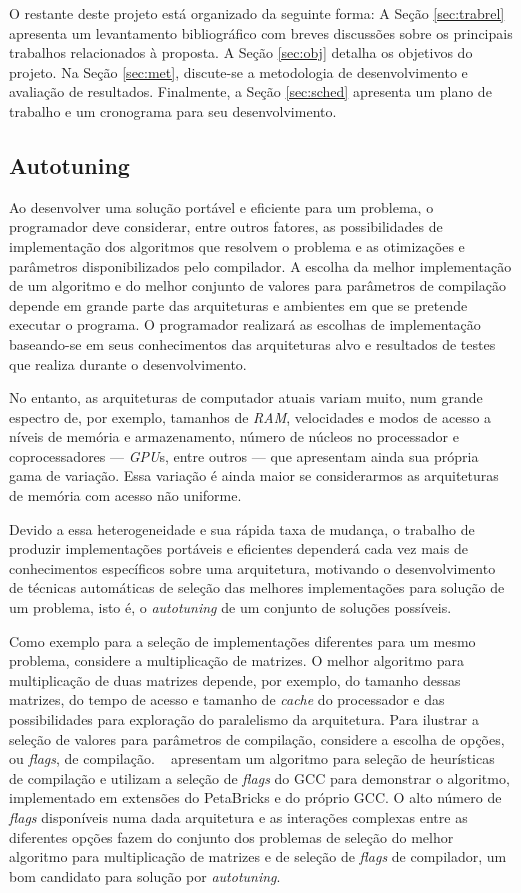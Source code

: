\documentclass[a4paper, 12pt]{article}
\begin{document}
O restante deste projeto está organizado da seguinte forma: 
A Seção \ref{sec:trabrel} apresenta um levantamento bibliográfico com breves
discussões sobre os principais trabalhos relacionados à proposta.
A Seção \ref{sec:obj} detalha os objetivos do projeto. Na Seção 
\ref{sec:met}, discute-se a metodologia de desenvolvimento e avaliação de 
resultados. Finalmente, a Seção \ref{sec:sched} apresenta um plano de trabalho
e um cronograma para seu desenvolvimento. 

\subsection{Autotuning} \label{sec:autotuning}

Ao desenvolver uma solução portável e eficiente para um problema, o
programador deve considerar, entre outros fatores, as possibilidades
de implementação dos algoritmos que resolvem o problema e as otimizações e 
parâmetros disponibilizados pelo compilador.
A escolha da melhor implementação de um algoritmo e do melhor conjunto de 
valores para parâmetros de compilação depende em grande parte das arquiteturas
e ambientes em que se pretende executar o programa. O programador realizará 
as escolhas de implementação baseando-se em seus conhecimentos das arquiteturas
alvo e resultados de testes que realiza durante o desenvolvimento.

No entanto, as arquiteturas de computador atuais variam muito, num grande 
espectro de, por exemplo, tamanhos de \emph{RAM},
velocidades e modos de acesso a níveis de memória e armazenamento, número de 
núcleos no processador e coprocessadores --- \emph{GPU}s, entre outros 
--- que apresentam ainda sua própria gama de variação. Essa variação é
ainda maior se considerarmos as arquiteturas de memória com acesso 
não uniforme.

Devido a essa heterogeneidade e sua rápida taxa de mudança, 
o trabalho de produzir implementações portáveis e eficientes 
dependerá cada vez mais de conhecimentos específicos sobre uma arquitetura,
motivando o desenvolvimento de técnicas automáticas de seleção das melhores
implementações para solução de um problema, isto é, o \emph{autotuning} de um
conjunto de soluções possíveis.

Como exemplo para a seleção de implementações diferentes para um mesmo
problema, considere a multiplicação de matrizes. O melhor algoritmo
para multiplicação de duas matrizes depende, por exemplo, do tamanho dessas
matrizes, do tempo de acesso e tamanho de \textit{cache} do processador e das 
possibilidades para exploração do paralelismo da arquitetura.
Para ilustrar a seleção de valores para parâmetros de compilação, considere
a escolha de opções, ou \emph{flags}, de compilação.
~\citet{tartara2013heuristics} apresentam um algoritmo para seleção de 
heurísticas de compilação e utilizam a seleção de \emph{flags}
do GCC para demonstrar o algoritmo, implementado em extensões do PetaBricks e 
do próprio GCC. 
O alto número de \emph{flags} disponíveis numa dada arquitetura e as interações
complexas entre as diferentes opções fazem do conjunto dos problemas de 
seleção do melhor algoritmo para multiplicação de matrizes e de seleção de 
\emph{flags} de compilador, um bom candidato para solução por 
\emph{autotuning}.
\end{document}
